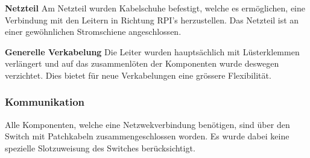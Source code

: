 \textbf{Netzteil}\newline
Am Netzteil wurden Kabelschuhe befestigt, welche es ermöglichen, eine Verbindung mit den Leitern in Richtung RPI's herzustellen. Das Netzteil ist an einer gewöhnlichen Stromschiene angeschlossen.

\textbf{Generelle Verkabelung}\newline
Die Leiter wurden hauptsächlich mit Lüsterklemmen verlängert und auf das zusammenlöten der Komponenten wurde deswegen verzichtet. Dies bietet für neue Verkabelungen eine grössere Flexibilität.

\subsubsection{Kommunikation}
Alle Komponenten, welche eine Netzwekverbindung benötigen, sind über den Switch mit Patchkabeln zusammengeschlossen worden. Es wurde dabei keine spezielle Slotzuweisung des Switches berücksichtigt.


